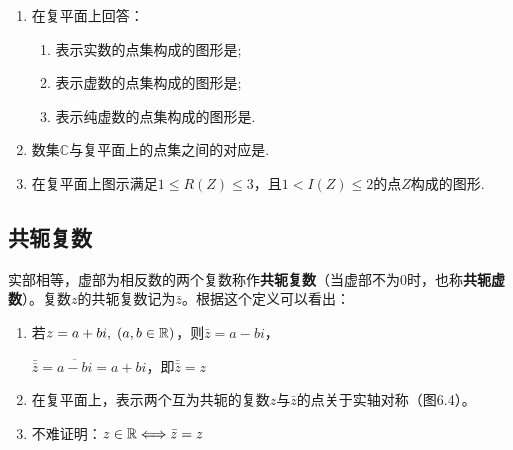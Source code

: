 \begin{ex}
\begin{enumerate}
    \item 在复平面上回答：
\begin{enumerate}[(1)]
\item 表示实数的点集构成的图形是\blank\blank ;
\item 表示虚数的点集构成的图形是\blank\blank ;
\item 表示纯虚数的点集构成的图形是\blank\blank .
\end{enumerate}

    \item 数集$\mathbb{C}$与复平面上的点集之间的对应是\blank\blank .
    \item 在复平面上图示满足$1\le R(Z)\le 3$，且$1< I(Z)\le 2$的点$Z$构成的图形.
\end{enumerate}   
\end{ex}

\subsection{共轭复数}
实部相等，虚部为相反数的两个复数称作\textbf{共轭复数}（当虚部不为0时，也称\textbf{共轭虚数}）。复数$z$的共轭复数记为$\bar z$。根据这个定义可以看出：

\noindent
\begin{minipage}{.55\textwidth}
\begin{enumerate}[(1)]
\item 若$z=a+bi,\; (a,b\in\mathbb{R})$，则$\bar z=a-bi$，

$\bar{\bar z}=\overline{a-bi}=a+bi$，即$\bar{\bar z}=z$
\item 在复平面上，表示两个互为共轭的复数$z$与$\bar z$的点关于实轴对称（图6.4）。
\item 不难证明：$z\in\mathbb{R} \Longleftrightarrow \bar z=z$
\end{enumerate}
\end{minipage}\hfill
\begin{minipage}{.4\textwidth}
\centering
{}   
\end{minipage}

